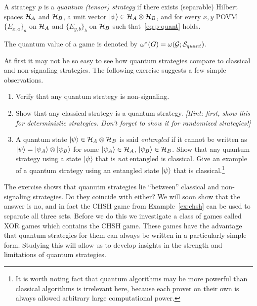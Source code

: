 \begin{definition}
A strategy $p$ is a \emph{quantum (tensor) strategy} if there exists (separable) Hilbert spaces $\mathcal{H}_A$ and $\mathcal{H}_B$, a unit vector $|\psi\rangle\in \mathcal{H}_A\otimes \mathcal{H}_B$, and for every $x,y$ POVM $\{E_{x,a}\}_a$ on $\mathcal{H}_A$ and $\{E_{y,b}\}_b$ on $\mathcal{H}_B$ such that~\eqref{eq:p-quant} holds. 

The quantum value of a game is denoted by $\omega^*(G) = \omega(\mathcal{G};\mathcal{S}_{quant})$. 
\end{definition}

At first it may not be so easy to see how quantum strategies compare to classical and non-signaling strategies. The following exercise suggests a few simple observations. 

\begin{exercise}
\begin{enumerate}
\item Verify that any quantum strategy is non-signaling.
\item Show that any classical strategy is a quantum strategy. \emph{[Hint: first, show this for deterministic strategies. Don't forget to show it for randomized strategies!]}
\item A quantum state $|\psi\rangle\in \mathcal{H}_A\otimes \mathcal{H}_B$ is said \emph{entangled} if it cannot be written as $|\psi\rangle=|\psi_A\rangle\otimes |\psi_B\rangle$ for some $|\psi_A\rangle\in\mathcal{H}_A$, $|\psi_B\rangle\in \mathcal{H}_B$. Show that any quantum strategy using a state $|\psi\rangle$ that is \emph{not} entangled is classical. Give an example of a quantum strategy using an entangled state $|\psi\rangle$ that is classical.\footnote{It is worth noting fact that quantum algorithms may be more powerful than classical algorithms is irrelevant here, because each prover on their own is always allowed arbitrary large computational power.}
\end{enumerate}
\end{exercise}

The exercise shows that quanutm strategies lie ``between'' classical and non-signaling strategies. Do they coincide with either? We will soon show that the answer is no, and in fact the CHSH game from Example~\ref{ex:chsh} can be used to separate all three sets. Before we do this we investigate a class of games called XOR games which contains the CHSH game. These games have the advantage that quantum strategies for them can always be written in a particularly simple form. Studying this will allow us to develop insights in the strength and limitations of quantum strategies. 



